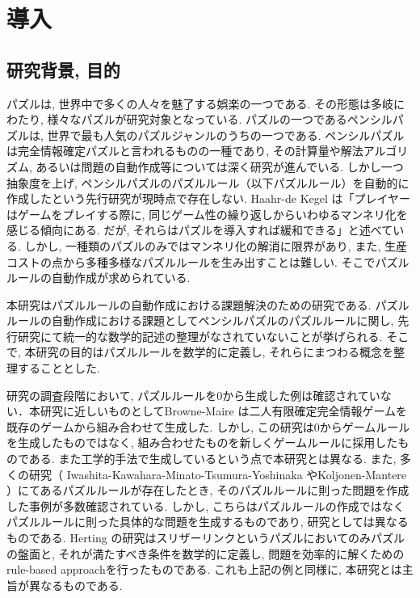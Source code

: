 \chapter{導入}
\section{研究背景, 目的}\label{section:Introduction}
パズルは, 世界中で多くの人々を魅了する娯楽の一つである. その形態は多岐にわたり, 様々なパズルが研究対象となっている. パズルの一つであるペンシルパズルは, 世界で最も人気のパズルジャンルのうちの一つである. ペンシルパズルは完全情報確定パズルと言われるものの一種であり, その計算量や解法アルゴリズム, あるいは問題の自動作成等については深く研究が進んでいる. しかし一つ抽象度を上げ, ペンシルパズルのパズルルール（以下パズルルール）を自動的に作成したという先行研究が現時点で存在しない. Haahr-de Kegel \cite{Barbara2020}は「プレイヤーはゲームをプレイする際に, 同じゲーム性の繰り返しからいわゆるマンネリ化を感じる傾向にある. だが, それらはパズルを導入すれば緩和できる」と述べている. しかし, 一種類のパズルのみではマンネリ化の解消に限界があり, また, 生産コストの点から多種多様なパズルルールを生み出すことは難しい. そこでパズルルールの自動作成が求められている.

本研究はパズルルールの自動作成における課題解決のための研究である. パズルルールの自動作成における課題としてペンシルパズルのパズルルールに関し, 先行研究にて統一的な数学的記述の整理がなされていないことが挙げられる. そこで, 本研究の目的はパズルルールを数学的に定義し, それらにまつわる概念を整理することとした.

研究の調査段階において, パズルルールを0から生成した例は確認されていない．本研究に近しいものとしてBrowne-Maire \cite{Browne2010}は二人有限確定完全情報ゲームを既存のゲームから組み合わせて生成した. しかし, この研究は0からゲームルールを生成したものではなく, 組み合わせたものを新しくゲームルールに採用したものである. また工学的手法で生成しているという点で本研究とは異なる. また, 多くの研究（
Iwashita-Kawahara-Minato-Tsumura-Yoshinaka
\cite{Yoshinaka2012}やKoljonen-Mantere \cite{Mantere2007}）にてあるパズルルールが存在したとき, そのパズルルールに則った問題を作成した事例が多数確認されている. しかし, こちらはパズルルールの作成ではなくパズルルールに則った具体的な問題を生成するものであり, 研究としては異なるものである. Herting	 \cite{Herting2004}の研究はスリザーリンクというパズルにおいてのみパズルの盤面と, それが満たすべき条件を数学的に定義し, 問題を効率的に解くためのrule-based approachを行ったものである. これも上記の例と同様に, 本研究とは主旨が異なるものである.



